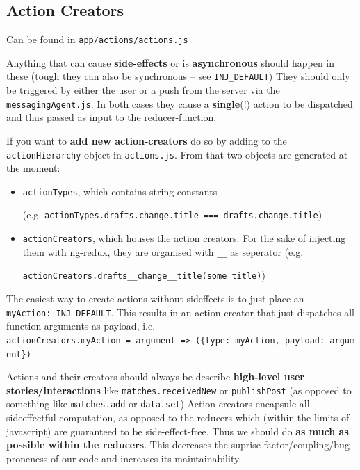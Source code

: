 \subsection{Action Creators}\label{sct:action-creators}

Can be found in \texttt{app/actions/actions.js} %

Anything that can cause \textbf{side-effects} or is
\textbf{asynchronous} should happen in these (tough they can also
be synchronous -- see \texttt{INJ\_DEFAULT}) %
They should only be triggered
by either the user or a push from the server via the
\texttt{messagingAgent.js}. In both cases they cause a
\textbf{single}(!) action to be dispatched and thus passed as
input to the reducer-function.

If you want to \textbf{add new action-creators} do so by adding to the
\texttt{actionHierarchy}-object in \texttt{actions.js}. %
From that two objects are generated at the moment:

\begin{itemize}
\tightlist
\item
  \texttt{actionTypes}, which contains string-constants

  (e.g.
  \texttt{actionTypes.drafts.change.title\ ===\
  \textquotesingle{}drafts.change.title\textquotesingle{}})
\item
  \texttt{actionCreators}, which houses the action creators. For the
  sake of injecting them with ng-redux, they are organised with
  \texttt{\_\_} as seperator (e.g.

  \texttt{actionCreators.drafts\_\_change\_\_title(\textquotesingle{}some\ title\textquotesingle{})})
\end{itemize}

The easiest way to create actions without sideffects is to just place
an \texttt{myAction:\ INJ\_DEFAULT}. This results in an action-creator
that just dispatches all function-arguments as payload, i.e.
\texttt{actionCreators.myAction\ =\ argument\ =\textgreater{}\ (\{type:\ \textquotesingle{}myAction\textquotesingle{},\ payload:\ argument\})}

Actions and their creators should always be describe \textbf{high-level user
stories/interactions} like \texttt{matches.receivedNew} or \texttt{publishPost}
(as opposed to something like \texttt{matches.add}
or \texttt{data.set})
Action-creators
encapsule all sideeffectful computation, as opposed to the reducers
which (within the limits of javascript) are guaranteed to be
side-effect-free. Thus we should do \textbf{as much as possible within
the reducers}. This decreases the suprise-factor/coupling/bug-proneness
of our code and increases its maintainability.

